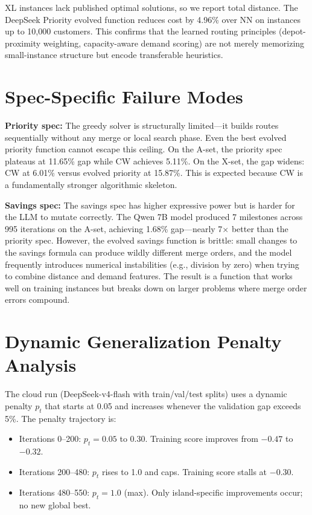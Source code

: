\documentclass{article}
\begin{document}
XL instances lack published optimal solutions, so we report total distance. The DeepSeek Priority evolved function reduces cost by 4.96\% over NN on instances up to 10,000 customers. This confirms that the learned routing principles (depot-proximity weighting, capacity-aware demand scoring) are not merely memorizing small-instance structure but encode transferable heuristics.

\section{Spec-Specific Failure Modes}
\label{app:failure}

\textbf{Priority spec:} The greedy solver is structurally limited---it builds routes sequentially without any merge or local search phase. Even the best evolved priority function cannot escape this ceiling. On the A-set, the priority spec plateaus at 11.65\% gap while CW achieves 5.11\%. On the X-set, the gap widens: CW at 6.01\% versus evolved priority at 15.87\%. This is expected because CW is a fundamentally stronger algorithmic skeleton.

\textbf{Savings spec:} The savings spec has higher expressive power but is harder for the LLM to mutate correctly. The Qwen 7B model produced 7 milestones across 995 iterations on the A-set, achieving 1.68\% gap---nearly 7$\times$ better than the priority spec. However, the evolved savings function is brittle: small changes to the savings formula can produce wildly different merge orders, and the model frequently introduces numerical instabilities (e.g., division by zero) when trying to combine distance and demand features. The result is a function that works well on training instances but breaks down on larger problems where merge order errors compound.

\section{Dynamic Generalization Penalty Analysis}
\label{app:penalty}

The cloud run (DeepSeek-v4-flash with train/val/test splits) uses a dynamic penalty $p_t$ that starts at 0.05 and increases whenever the validation gap exceeds 5\%. The penalty trajectory is:

\begin{itemize}
\item Iterations 0--200: $p_t = 0.05$ to $0.30$. Training score improves from $-0.47$ to $-0.32$.
\item Iterations 200--480: $p_t$ rises to 1.0 and caps. Training score stalls at $-0.30$.
\item Iterations 480--550: $p_t = 1.0$ (max). Only island-specific improvements occur; no new global best.
\end{itemize}
\end{document}
